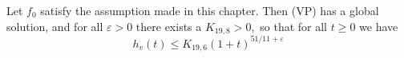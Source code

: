 
\begin{theorem}
Let $f_0$ satisfy the assumption made in this chapter. Then (VP) has a global solution, and for all $\varepsilon>0$ there exists a $K_{19,8}>0,$ so that for all $t \geqslant 0$
we have
\[
h_{v}(t) \leqslant K_{19,6}(1+t)^{51 / 11+\varepsilon}
\]
\end{theorem}


